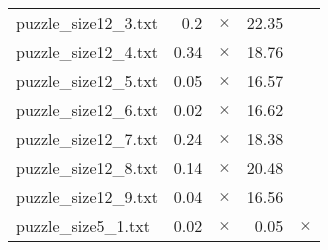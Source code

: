 \documentclass{article}
\begin{document}
\begin{center}
\begin{tabular}{lrrrr}
puzzle\_size12\_3.txt & 0.2 & 
$\times$
 & 22.35 & 
\\
puzzle\_size12\_4.txt & 0.34 & 
$\times$
 & 18.76 & 
\\
puzzle\_size12\_5.txt & 0.05 & 
$\times$
 & 16.57 & 
\\
puzzle\_size12\_6.txt & 0.02 & 
$\times$
 & 16.62 & 
\\
puzzle\_size12\_7.txt & 0.24 & 
$\times$
 & 18.38 & 
\\
puzzle\_size12\_8.txt & 0.14 & 
$\times$
 & 20.48 & 
\\
puzzle\_size12\_9.txt & 0.04 & 
$\times$
 & 16.56 & 
\\
puzzle\_size5\_1.txt & 0.02 & 
$\times$
 & 0.05 & 
$\times$
\\
\hline\end{tabular}
\end{center}
\end{document}
